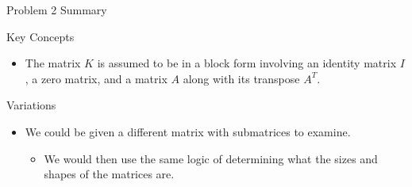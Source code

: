 \begin{summary}{Problem 2 Summary}
\begin{statement}{Key Concepts}
\begin{itemize}
\begin{itemize}
                \item The matrix $K$ is assumed to be in a block form involving an identity matrix $I$, a zero matrix, and a matrix $A$ along with its transpose $A^{T}$.
            \end{itemize}
        \end{itemize}
    \end{statement}
    \begin{statement}{Variations}
        \begin{itemize}
            \item We could be given a different matrix with submatrices to examine.
            \begin{itemize}
                \item We would then use the same logic of determining what the sizes and shapes of the matrices are.
            \end{itemize}
        \end{itemize}
    \end{statement}
\end{summary}

